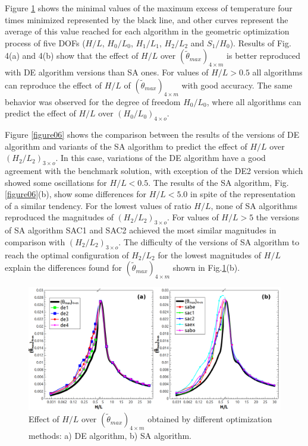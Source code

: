 \documentclass[12pt,fleqn]{article}
\begin{document}
Figure \ref{figure04} shows  the minimal values of the maximum excess of temperature four times minimized represented by the black line, and other curves represent the average of this value reached for each algorithm in the geometric optimization process of five DOFs ($H/L$, $H_{0}/L_{0}$, $H_{1}/L_{1}$, $H_{2}/L_{2}$ and $S_{1}/H_{0}$). Results of Fig. 4(a) and 4(b) show that the effect of $H/L$ over $(\tilde{\theta}_{max})_{4\times m}$ is better reproduced with DE algorithm versions than SA ones. For values of $H/L > 0.5$ all algorithms can reproduce the effect of $H/L$ of $(\tilde{\theta}_{max})_{4\times m}$ with good accuracy. The same behavior was observed for the degree of freedom $H_{0}/L_{0}$, where all algorithms can predict the effect of $H/L$ over ${(H_{0}/L_{0})_{4\times o}}$.



Figure \ref{figure06} shows the comparison between the results of the versions of DE algorithm and variants of the SA algorithm to predict the effect of $H/L$ over ${(H_{2}/L_{2})_{3\times o}}$. In this case, variations of the DE algorithm have a good agreement with the benchmark solution, with exception of the DE2 version which showed some oscillations for $H/L< 0.5$. The results of the SA algorithm, Fig. \ref{figure06}(b), show some differences for $H/L < 5.0$ in spite of the representation of a similar tendency. For the lowest values of ratio $H/L$, none of SA algorithms reproduced the magnitudes of ${(H_{2}/L_{2})_{3\times o}}$. For values of $H/L > 5$ the versions of SA algorithm SAC1 and SAC2 achieved the most similar magnitudes in comparison with ${(H_{2}/L_{2})_{3\times o}}$. The difficulty of the versions of SA algorithm to reach the optimal configuration of $H_{2}/L_{2}$ for the lowest magnitudes of $H/L$ explain the differences found for $(\tilde{\theta}_{max})_{4\times m}$ shown in Fig.\ref{figure04}(b).

\begin{figure}[H]
\centering
\includegraphics[width=1\linewidth]{imgs/5dof/de_sa_hl_tmin.png}
\caption{ {\small Effect of $H/L$ over $(\tilde{\theta}_{max})_{4\times m}$ obtained by different optimization methods: a) DE algorithm, b) SA algorithm.}}
\label{figure04}
\end{figure}
\end{document}
